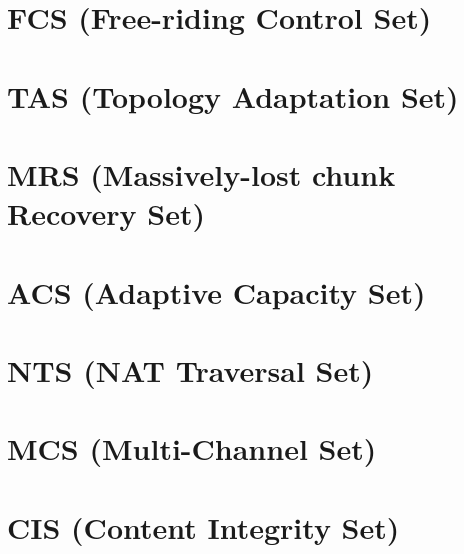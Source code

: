 \section{FCS (Free-riding Control Set)}


\section{TAS (Topology Adaptation Set)}


\section{MRS (Massively-lost chunk Recovery Set)}


\section{ACS (Adaptive Capacity Set)}


\section{NTS (NAT Traversal Set)}


\section{MCS (Multi-Channel Set)}


\section{CIS (Content Integrity Set)}


%


